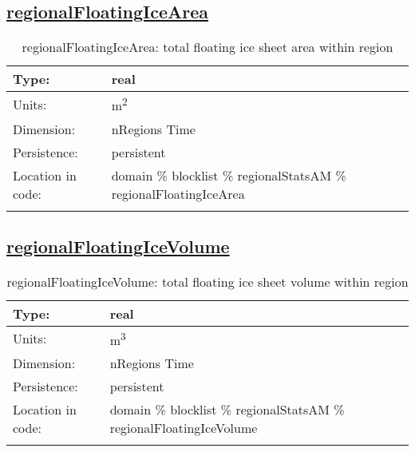 \subsection[regionalFloatingIceArea]{\hyperref[sec:var_tab_regionalStatsAM]{regionalFloatingIceArea}}
\label{subsec:var_sec_regionalStatsAM_regionalFloatingIceArea}
\begin{center}
\begin{longtable}{| p{2.0in} | p{4.0in} |}
        \hline 
        Type: & real \\
        \hline 
        Units: & \si{m^2} \\
        \hline 
        Dimension: & nRegions Time \\
        \hline 
        Persistence: & persistent \\
        \hline 
         Location in code: & domain \% blocklist \% regionalStatsAM \% regionalFloatingIceArea \\
         \hline 
    \caption{regionalFloatingIceArea: total floating ice sheet area within region}
\end{longtable}
\end{center}
\subsection[regionalFloatingIceVolume]{\hyperref[sec:var_tab_regionalStatsAM]{regionalFloatingIceVolume}}
\label{subsec:var_sec_regionalStatsAM_regionalFloatingIceVolume}
\begin{center}
\begin{longtable}{| p{2.0in} | p{4.0in} |}
        \hline 
        Type: & real \\
        \hline 
        Units: & \si{m^3} \\
        \hline 
        Dimension: & nRegions Time \\
        \hline 
        Persistence: & persistent \\
        \hline 
         Location in code: & domain \% blocklist \% regionalStatsAM \% regionalFloatingIceVolume \\
         \hline 
    \caption{regionalFloatingIceVolume: total floating ice sheet volume within region}
\end{longtable}
\end{center}
